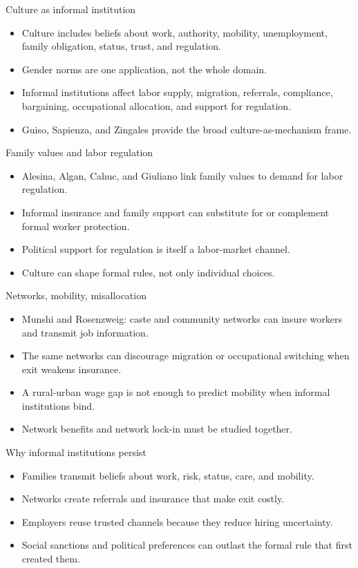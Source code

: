 \documentclass[aspectratio=169,11pt]{beamer}
\begin{document}
\begin{frame}{Culture as informal institution}
\begin{itemize}
    \item Culture includes beliefs about work, authority, mobility, unemployment, family obligation, status, trust, and regulation.
    \item Gender norms are one application, not the whole domain.
    \item Informal institutions affect labor supply, migration, referrals, compliance, bargaining, occupational allocation, and support for regulation.
    \item Guiso, Sapienza, and Zingales provide the broad culture-as-mechanism frame.
\end{itemize}
\end{frame}

\begin{frame}{Family values and labor regulation}
\begin{itemize}
    \item Alesina, Algan, Cahuc, and Giuliano link family values to demand for labor regulation.
    \item Informal insurance and family support can substitute for or complement formal worker protection.
    \item Political support for regulation is itself a labor-market channel.
    \item Culture can shape formal rules, not only individual choices.
\end{itemize}
\end{frame}

\begin{frame}{Networks, mobility, misallocation}
\begin{itemize}
    \item Munshi and Rosenzweig: caste and community networks can insure workers and transmit job information.
    \item The same networks can discourage migration or occupational switching when exit weakens insurance.
    \item A rural-urban wage gap is not enough to predict mobility when informal institutions bind.
    \item Network benefits and network lock-in must be studied together.
\end{itemize}
\end{frame}

\begin{frame}{Why informal institutions persist}
\begin{itemize}
    \item Families transmit beliefs about work, risk, status, care, and mobility.
    \item Networks create referrals and insurance that make exit costly.
    \item Employers reuse trusted channels because they reduce hiring uncertainty.
    \item Social sanctions and political preferences can outlast the formal rule that first created them.
\end{itemize}
\end{frame}
\end{document}
